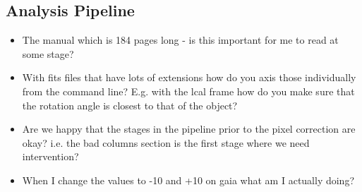 \documentclass{literature}
\begin{document}
\subsection{Analysis Pipeline}\label{que:analysis_pipeline}
\begin{itemize}
	\item The manual which is 184 pages long - is this important for me to read at some stage?
	\item With fits files that have lots of extensions how do you axis those individually from the command line? E.g. with the lcal frame how do you make sure that the rotation angle is closest to that of the object? 
	\item Are we happy that the stages in the pipeline prior to the pixel correction are okay? i.e. the bad columns section is the first stage where we need intervention?
	\item When I change the values to -10 and +10 on gaia what am I actually doing? 
\end{itemize}


\clearpage 

%

\end{document}
